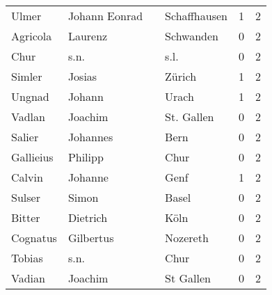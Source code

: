 \begin{tabular}{llllrr}
                    Ulmer &                      Johann Eonrad &             &                                Schaffhausen &          1 &         2 \\
                 Agricola &                            Laurenz &             &                                   Schwanden &          0 &         2 \\
                     Chur &                               s.n. &             &                                        s.l. &          0 &         2 \\
                   Simler &                             Josias &             &                                      Zürich &          1 &         2 \\
                   Ungnad &                             Johann &             &                                       Urach &          1 &         2 \\
                   Vadlan &                            Joachim &             &                                  St. Gallen &          0 &         2 \\
                   Salier &                           Johannes &             &                                        Bern &          0 &         2 \\
                Gallieius &                            Philipp &             &                                        Chur &          0 &         2 \\
                   Calvin &                            Johanne &             &                                        Genf &          1 &         2 \\
                   Sulser &                              Simon &             &                                       Basel &          0 &         2 \\
                   Bitter &                           Dietrich &             &                                        Köln &          0 &         2 \\
                 Cognatus &                          Gilbertus &             &                                    Nozereth &          0 &         2 \\
                   Tobias &                               s.n. &             &                                        Chur &          0 &         2 \\
                   Vadian &                            Joachim &             &                                   St Gallen &          0 &         2 \\

\end{tabular}
